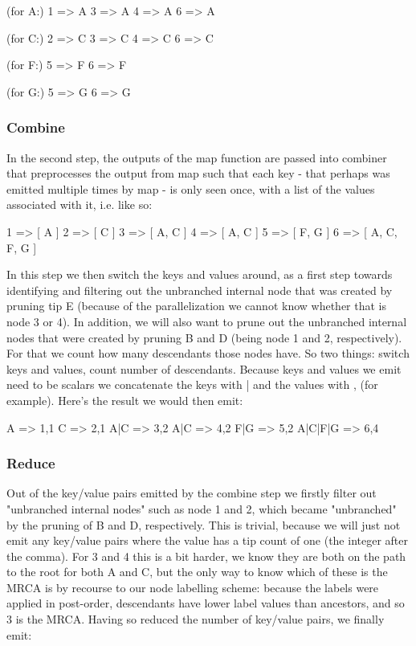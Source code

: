 \documentclass[10pt]{bmc_article}
\newenvironment{bmcformat}{\begin{raggedright}\baselineskip20pt\sloppy\setboolean{publ}{false}}{\end{raggedright}\baselineskip20pt\sloppy}
\begin{document}
\begin{bmcformat}
		 (for A:)
		 1 => A
		 3 => A
		 4 => A
		 6 => A
		
		 (for C:)
		 2 => C
		 3 => C
		 4 => C
		 6 => C
		
		 (for F:)
		 5 => F
		 6 => F
		
		 (for G:)
		 5 => G
		 6 => G

	\subsubsection*{Combine}
		In the second step, the outputs of the map function are passed into combiner that preprocesses the output from map such that each key - that perhaps was emitted multiple times by map - is only seen once, with a list of the values associated with it, i.e. like so:

		 1 => [ A ]
		 2 => [ C ]
		 3 => [ A, C ]
		 4 => [ A, C ]
		 5 => [ F, G ]
		 6 => [ A, C, F, G ]

		In this step we then switch the keys and values around, as a first
		step towards identifying and filtering out the unbranched internal node 
		that was created by pruning tip E (because of the parallelization we 
		cannot know whether that is node 3 or 4). In addition, we will also 
		want to prune out the unbranched internal nodes that were created by 
		pruning B and D (being node 1 and 2, respectively). For that we count 
		how many descendants those nodes have. So two things: switch keys and 
		values, count number of descendants. Because keys and values we emit 
		need to be scalars we concatenate the keys with | and the values with , 
		(for example). Here's the result we would then emit:

		 A       => 1,1 %
		 C       => 2,1
		 A|C     => 3,2
		 A|C     => 4,2
		 F|G     => 5,2
		 A|C|F|G => 6,4

	\subsubsection*{Reduce}

		Out of the key/value pairs emitted by the combine step we firstly filter 
		out "unbranched internal nodes" such as node 1 and 2, which became 
		"unbranched" by the pruning of B and D, respectively. This is trivial, 
		because we will just not emit any key/value pairs where the value has a
		tip count of one (the integer after the comma). For 3 and 4 this is a bit 
		harder, we know they are both on the path to the root for both A and C, but the only way to know which of these is the MRCA is by recourse to our 
		node labelling scheme: because the labels were applied in post-order, descendants have lower label values than ancestors, and so 3 is the MRCA. 
		Having so reduced the number of key/value pairs, we finally emit:


\end{bmcformat}
\end{document}
